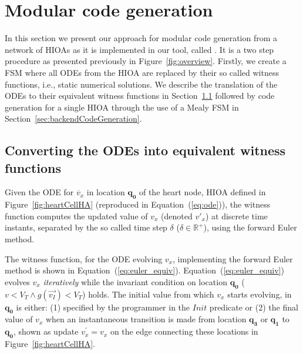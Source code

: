 \section{Modular code generation}
\label{sec:codeGen}

In this section we present our approach for modular code generation from
a network of \acp{HIOA} as it is implemented in our tool, called
\ourTool. It is a two step procedure as presented previously in
Figure~\ref{fig:overview}. Firstly, we create a \ac{FSM} where all \acp{ODE} 
from the \ac{HIOA} are replaced by their so called witness functions, i.e.,
static numerical solutions. We describe the translation of the \acp{ODE}
to their equivalent witness functions in
Section~\ref{sec:converting-odes-into} followed by code generation for a
single \ac{HIOA} through the use of a Mealy \ac{FSM} in
Section~\ref{sec:backendCodeGeneration}.

\subsection{Converting the \acp{ODE} into equivalent witness functions}
\label{sec:converting-odes-into}

Given the \ac{ODE} for $\dot{v_x}$ in location $\mathbf{q_0}$ of the
heart node, \ac{HIOA} defined in Figure~\ref{fig:heartCellHA}
(reproduced in Equation~(\ref{eq:ode})), the witness function computes
the updated value of $v_{x}$ (denoted $v'_{x}$) at discrete time
instants, separated by the so called time step $\delta$
($\delta \in \mathbb{R}^{+}$), using the forward Euler method.  

The witness function, for the \ac{ODE} evolving $v_{x}$, implementing
the forward Euler method is shown in Equation~(\ref{eq:euler_equiv}).
Equation~(\ref{eq:euler_equiv}) evolves $v_{x}$ \emph{iteratively} while
the invariant condition on location $\mathbf{q_{0}}$ ($v < V_T \wedge 
g(\vec{v_{I}}) < V_T$)
holds. The initial value from which $v_{x}$ starts evolving, in
$\mathbf{q_{0}}$ is either: (1) specified by the programmer in the
$Init$ predicate or (2) the final value of $v_{x}$ when an instantaneous
transition is made from location $\mathbf{q_{3}}$ or $\mathbf{q_{1}}$ to 
$\mathbf{q_{0}}$, shown as update $v^{\prime}_{x} = v_{x}$ on the edge 
connecting these locations in Figure~\ref{fig:heartCellHA}.

\setlength{\belowdisplayskip}{-0.5\baselineskip} 
\setlength{\belowdisplayshortskip}{-0.5\baselineskip}
\setlength{\abovedisplayskip}{-0.5\baselineskip} 
\setlength{\abovedisplayshortskip}{-0.5\baselineskip}


